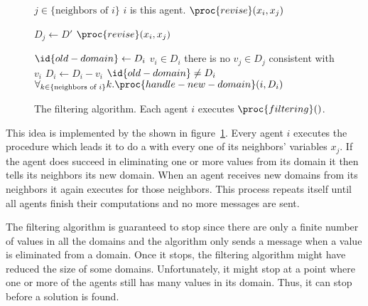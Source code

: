 \begin{SCfigure}
  \begin{minipage}{1.0\linewidth}
    \begin{codebox}
      \li \For $j \in \{\text{neighbors of }i\}$ \hspace{3em}\Comment $i$ is this agent.
      \li \Do  $\proc{revise}(x_i,x_j)$
          \End
    \end{codebox}
    \begin{codebox}
      \li $D_j \gets D'$
      \li $\proc{revise}(x_i,x_j)$
    \end{codebox}
    \begin{codebox}
      \li $\id{old-domain} \gets D_i$
      \li \For $v_i \in D_i$ 
      \li \Do \If there is no $v_j \in D_j$ consistent with $v_i$
      \li     \Then $D_i \gets D_i - v_i$
              \End
          \End
      \li \If $\id{old-domain} \neq D_i$
      \li \Then $\forall_{k \in \{\text{neighbors of } i\}} k.\proc{handle-new-domain}(i,D_i)$
           \End
    \end{codebox}
  \end{minipage}
  \caption{The filtering algorithm. Each agent $i$ executes
    $\proc{filtering}()$.}
  \label{fig:filtering}
\end{SCfigure}

This idea is implemented by the 
\cite{waltz75} shown in figure~\ref{fig:filtering}. Every agent $i$
executes the  procedure which leads it to do a
 with every one of its neighbors' variables $x_j$. If the
agent does succeed in eliminating one or more values from its domain
it then tells its neighbors its new domain.  When an agent receives
new domains from its neighbors it again executes  for
those neighbors. This process repeats itself until all agents finish
their computations and no more messages are sent.

The filtering algorithm is guaranteed to stop since there are only a
finite number of values in all the domains and the algorithm only
sends a message when a value is eliminated from a domain. Once it
stops, the filtering algorithm might have reduced the size of some
domains. Unfortunately, it might stop at a point where one or more of
the agents still has many values in its domain. Thus, it can stop
before a solution is found.

